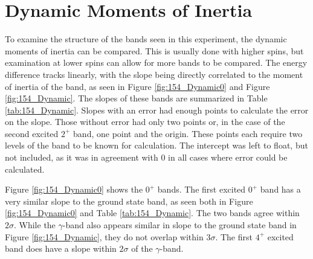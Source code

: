 \section{Dynamic Moments of Inertia}
\label{sec:154_Dynamic}

To examine the structure of the bands seen in this experiment, the dynamic moments of inertia can be compared. This is usually done with higher spins, but examination at lower spins can allow for more bands to be compared. The energy difference tracks linearly, with the slope being directly correlated to the moment of inertia of the band, as seen in Figure \ref{fig:154_Dynamic0} and Figure \ref{fig:154_Dynamic}. The slopes of these bands are summarized in Table \ref{tab:154_Dynamic}. Slopes with an error had enough points to calculate the error on the slope. Those without error had only two points or, in the case of the second excited $2^+$ band, one point and the origin. These points each require two levels of the band to be known for calculation. The intercept was left to float, but not included, as it was in agreement with 0 in all cases where error could be calculated.







Figure \ref{fig:154_Dynamic0} shows the $0^+$ bands. The first excited $0^+$ band has a very similar slope to the ground state band, as seen both in Figure \ref{fig:154_Dynamic0} and Table \ref{tab:154_Dynamic}. The two bands agree within $2\sigma$. While the $\gamma$-band also appears similar in slope to the ground state band in Figure \ref{fig:154_Dynamic}, they do not overlap within $3\sigma$. The first $4^+$ excited band does have a slope within $2\sigma$ of the $\gamma$-band.